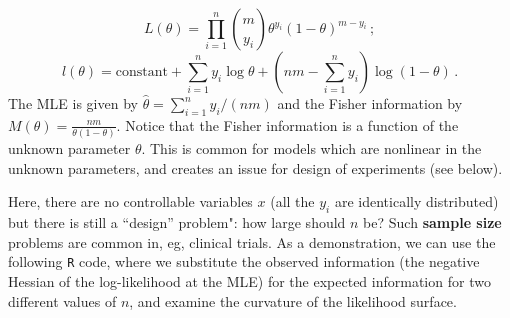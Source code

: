 \documentclass[
]{article}
\begin{document}
\[
L(\theta) = \prod_{i=1}^n{m \choose y_i}\theta^{y_i}(1-\theta)^{m-y_i}\,;
\] \[
l(\theta) = \text{constant} + \sum_{i=1}^n y_i\log \theta + \left(nm - \sum_{i=1}^n y_i\right)\log(1-\theta)\,.
\] The MLE is given by \(\hat{\theta} = \sum_{i=1}^ny_i/(nm)\) and the
Fisher information by \(M(\theta) = \frac{nm}{\theta(1-\theta)}\).
Notice that the Fisher information is a function of the unknown
parameter \(\theta\). This is common for models which are nonlinear in
the unknown parameters, and creates an issue for design of experiments
(see below).

Here, there are no controllable variables \(x\) (all the \(y_i\) are
identically distributed) but there is still a ``design'' problem": how
large should \(n\) be? Such \textbf{sample size} problems are common in,
eg, clinical trials. As a demonstration, we can use the following
\texttt{R} code, where we substitute the observed information (the
negative Hessian of the log-likelihood at the MLE) for the expected
information for two different values of \(n\), and examine the curvature
of the likelihood surface.
\end{document}
